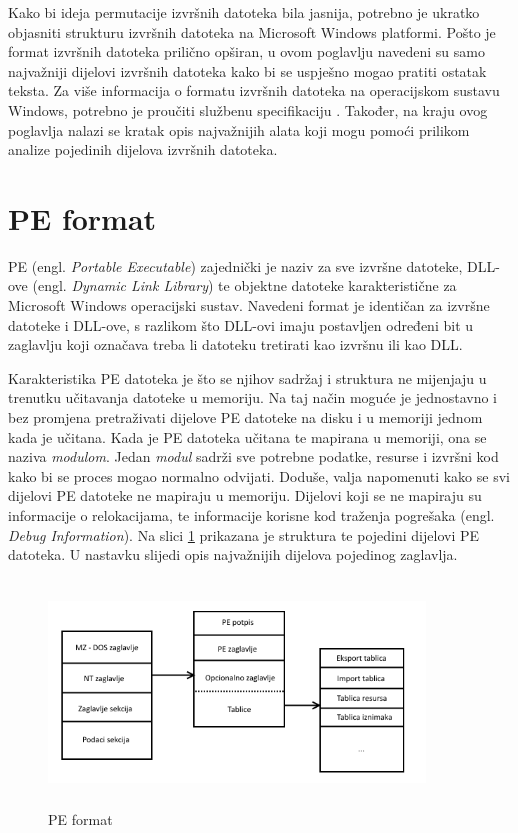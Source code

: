 \documentclass[times, utf8, diplomski, numeric]{fer}
\begin{document}
Kako bi ideja permutacije izvršnih datoteka bila jasnija,
potrebno je ukratko objasniti strukturu izvršnih datoteka na
Microsoft Windows platformi. Pošto je format izvršnih datoteka
prilično opširan, u ovom poglavlju navedeni su samo najvažniji
dijelovi izvršnih datoteka kako bi se uspješno mogao pratiti
ostatak teksta. Za više informacija o formatu izvršnih datoteka
na operacijskom sustavu Windows, potrebno je proučiti službenu
specifikaciju \citep{pe_spec}. Također, na kraju ovog poglavlja
nalazi se kratak opis najvažnijih alata koji mogu pomoći prilikom
analize pojedinih dijelova izvršnih datoteka.

\section{PE format}

PE (engl. \emph{Portable Executable}) zajednički je naziv za sve
izvršne datoteke, DLL-ove (engl. \emph{Dynamic Link Library}) te
objektne datoteke karakteristične za Microsoft Windows
operacijski sustav. Navedeni format je identičan za izvršne
datoteke i DLL-ove, s razlikom što DLL-ovi imaju postavljen
određeni bit u zaglavlju koji označava treba li datoteku
tretirati kao izvršnu ili kao DLL.

Karakteristika PE datoteka je što se njihov sadržaj i struktura
ne mijenjaju u trenutku učitavanja datoteke u memoriju. Na taj
način moguće je jednostavno i bez promjena pretraživati dijelove
PE datoteke na disku i u memoriji jednom kada je učitana. Kada je
PE datoteka učitana te mapirana u memoriji, ona se naziva
\emph{modulom}. Jedan \emph{modul} sadrži sve potrebne podatke,
resurse i izvršni kod kako bi se proces mogao normalno odvijati.
Doduše, valja napomenuti kako se svi dijelovi PE datoteke ne
mapiraju u memoriju. Dijelovi koji se ne mapiraju su informacije
o relokacijama, te informacije korisne kod traženja pogrešaka 
(engl. \emph{Debug Information}). Na slici \ref{fig:pe_format} 
prikazana je struktura te pojedini dijelovi PE datoteka. U
nastavku slijedi opis najvažnijih dijelova pojedinog zaglavlja.

\begin{figure}
\centering
\setlength\fboxsep{0pt}
\setlength\fboxrule{0.5pt}
\includegraphics[width=10cm, height=6cm]{slike/pe_format}
\caption{PE format}
\label{fig:pe_format} 
\end{figure} 
\end{document}
